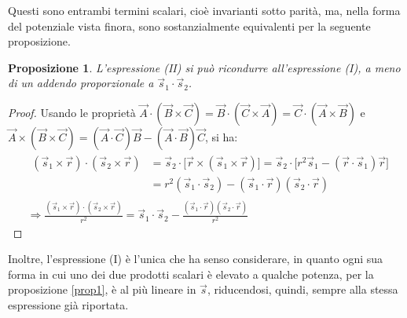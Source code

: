 \documentclass[11pt, a4paper]{scrartcl}
\theoremstyle{style}
\newtheorem{prop}{Proposizione}[section]
\numberwithin{equation}{subsection}
\begin{document}
Questi sono entrambi termini scalari, cio\`e invarianti sotto parit\`a, ma, nella forma del potenziale vista finora, sono sostanzialmente equivalenti per la seguente proposizione.
\begin{prop}
L'espressione (II) si pu\`o ricondurre all'espressione (I), a meno di un addendo proporzionale a $\vec{s}_1 \cdot \vec{s}_2$.
\end{prop}
\begin{proof}
	Usando le propriet\`a $\vec{A}\cdot (\vec{B}\times \vec{C}) = \vec{B} \cdot (\vec{C}\times \vec{A}) = \vec{C}\cdot  (\vec{A}\times \vec{B})$ e $\vec{A}\times (\vec{B}\times \vec{C}) = (\vec{A}\cdot \vec{C}) \vec{B} - (\vec{A}\cdot \vec{B}) \vec{C}$, si ha:
\[
	\begin{split}
		&\begin{split}
	(\vec{s}_1 \times \vec{r}) \cdot (\vec{s}_2 \times \vec{r}) &= \vec{s}_2 \cdot \big[ \vec{r}\times \left(\vec{s}_1 \times \vec{r}\right)  \big] = \vec{s}_2 \cdot \big[r^2 \vec{s}_1 - (\vec{r}\cdot \vec{s}_1) \vec{r}\big]\\
								    &= r^2 (\vec{s}_1 \cdot \vec{s}_2) - (\vec{s}_1 \cdot \vec{r}) (\vec{s}_2\cdot \vec{r})
\end{split}\\
		&\Rightarrow  \frac{(\vec{s}_1 \times \vec{r}) \cdot (\vec{s}_2 \times \vec{r})}{r^2} = \vec{s}_1 \cdot \vec{s}_2 - \frac{(\vec{s}_1\cdot \vec{r})(\vec{s}_2\cdot \vec{r})}{r^2}
	\end{split}
\] 
\end{proof}
\noindent Inoltre, l'espressione (I) \`e l'unica che ha senso considerare, in quanto ogni sua forma in cui uno dei due prodotti scalari \`e elevato a qualche potenza, per la proposizione \ref{prop1}, \`e al pi\`u lineare in $\vec{s}$, riducendosi, quindi, sempre alla stessa espressione gi\`a riportata.
\end{document}
